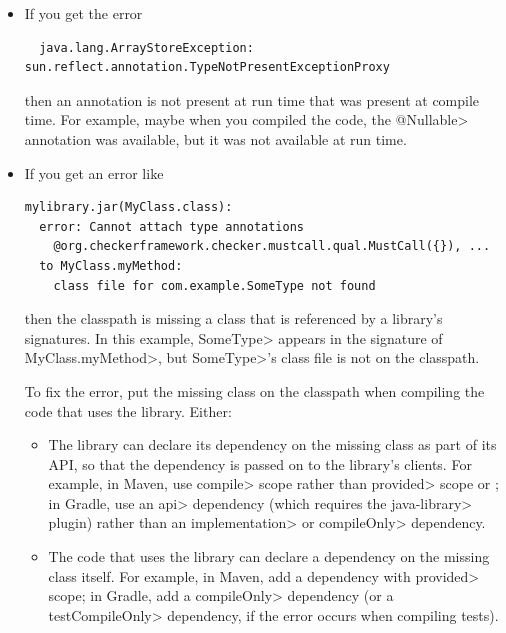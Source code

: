 \begin{itemize}
\item
If you get the error

\begin{Verbatim}
  java.lang.ArrayStoreException: sun.reflect.annotation.TypeNotPresentExceptionProxy
\end{Verbatim}

\noindent
then an annotation is not present at run time that was present at compile
time.  For example, maybe when you compiled the code, the \<@Nullable>
annotation was available, but it was not available at run time.

\item
  \label{cannot-attach-type-annotations}
If you get an error like

\begin{smaller}
\begin{Verbatim}
mylibrary.jar(MyClass.class):
  error: Cannot attach type annotations
    @org.checkerframework.checker.mustcall.qual.MustCall({}), ...
  to MyClass.myMethod:
    class file for com.example.SomeType not found
\end{Verbatim}
\end{smaller}

\noindent
then the classpath is missing a class that is referenced by a library's
signatures.  In this example, \<SomeType> appears in the signature of
\<MyClass.myMethod>, but \<SomeType>'s class file is not on the classpath.

To fix the error, put the missing class on the classpath when compiling
the code that uses the library.  Either:
\begin{itemize}
\item
  The library can declare its dependency on the missing class as part of
  its API, so that the dependency is passed on to the library's clients.
  For example, in Maven, use \<compile> scope rather than \<provided> scope
  or ; in Gradle, use an \<api> dependency
  (which requires the \<java-library> plugin) rather than an
  \<implementation> or \<compileOnly> dependency.
\item
  The code that uses the library can declare a dependency on the missing
  class itself.  For example, in Maven, add a dependency with \<provided>
  scope; in Gradle, add a \<compileOnly> dependency (or a
  \<testCompileOnly> dependency, if the error occurs when compiling tests).
\end{itemize}


\end{itemize}
